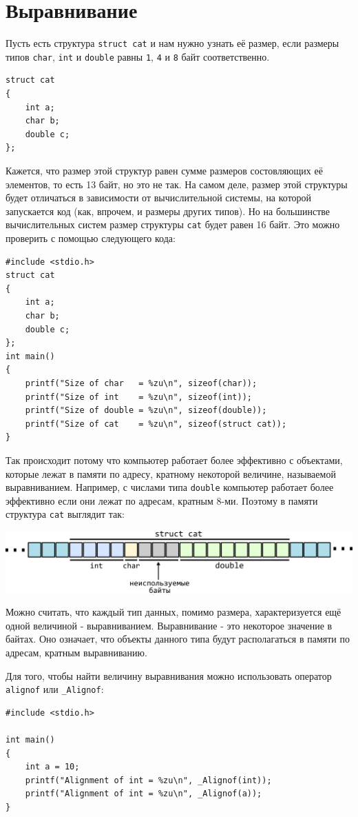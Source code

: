 \documentclass{article}
\begin{document}
\newpage
\section*{Выравнивание}
Пусть есть структура \texttt{struct cat} и нам нужно узнать её размер, если размеры типов \texttt{char}, \texttt{int} и \texttt{double} равны \texttt{1}, \texttt{4} и \texttt{8} байт соответственно.
\begin{lstlisting}
struct cat 
{
    int a;
    char b;
    double c;
};
\end{lstlisting}
Кажется, что размер этой структур равен сумме размеров состовляющих её элементов, то есть 13 байт, но это не так. На самом деле, размер этой структуры будет отличаться в зависимости от вычислительной системы, на которой запускается код (как, впрочем, и размеры других типов). Но на большинстве вычислительных систем размер структуры \texttt{cat} будет равен 16 байт. Это можно проверить с помощью следующего кода:
\begin{lstlisting}
#include <stdio.h>
struct cat 
{
    int a;
    char b;
    double c;
};
int main() 
{
    printf("Size of char   = %zu\n", sizeof(char));
    printf("Size of int    = %zu\n", sizeof(int));
    printf("Size of double = %zu\n", sizeof(double));
    printf("Size of cat    = %zu\n", sizeof(struct cat));
}
\end{lstlisting}

Так происходит потому что компьютер работает более эффективно с объектами, которые лежат в памяти по адресу, кратному некоторой величине, называемой выравниванием. Например, с числами типа \texttt{double} компьютер работает более эффективно если они лежат по адресам, кратным 8-ми. Поэтому в памяти структура \texttt{cat} выглядит так: 

\begin{center}
\includegraphics[scale=1]{../images/alignment.png}
\end{center}

Можно считать, что каждый тип данных, помимо размера, характеризуется ещё одной величиной - выравниванием. Выравнивание - это некоторое значение в байтах. Оно означает, что объекты данного типа будут располагаться в памяти по адресам, кратным выравниванию.

Для того, чтобы найти величину выравнивания можно использовать оператор \texttt{alignof} или \texttt{\_Alignof}:
\begin{lstlisting}
#include <stdio.h>

int main() 
{
    int a = 10;
    printf("Alignment of int = %zu\n", _Alignof(int));
    printf("Alignment of int = %zu\n", _Alignof(a));
}
\end{lstlisting}
\end{document}

